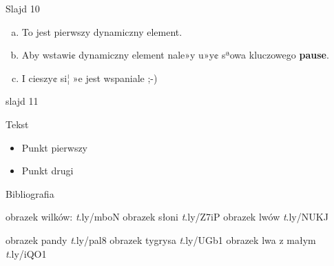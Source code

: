\documentclass{beamer}
\begin{document}
\begin{frame}{Slajd 10}
\begin{enumerate}[a)]
\item To jest pierwszy dynamiczny element.

\item Aby wstawi¢ dynamiczny element nale»y u»y¢ sªowa kluczowego \textbf{pause}.

\item I cieszy¢ si¦ »e jest wspaniale ;-)
\end{enumerate}
\end{frame}
\begin{frame}{slajd 11}
\begin{block}

Tekst 
\begin{itemize}
\item Punkt pierwszy
\item Punkt drugi
\end{itemize}
\end{block}
\end{frame}

\begin{frame}{Bibliografia}
\begin{thebibliography}{6}

	obrazek wilków: 
  \emph t.ly/mboN
	obrazek słoni
\emph t.ly/Z7iP
	obrazek lwów
\emph t.ly/NUKJ

obrazek pandy
\emph t.ly/pal8
obrazek tygrysa
 \emph t.ly/UGb1
obrazek lwa z małym 
\emph t.ly/iQO1

\end{thebibliography}

\end{frame}
\end{document}
